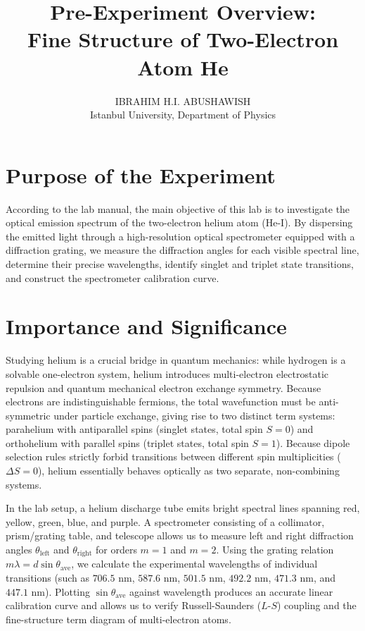 \documentclass[11pt,a4paper]{article}
\title{\textbf{Pre-Experiment Overview:\\ Fine Structure of Two-Electron Atom He}}
\author{IBRAHIM H.I. ABUSHAWISH \\ Istanbul University, Department of Physics}
\date{}
\begin{document}
\maketitle

\section*{Purpose of the Experiment}
According to the lab manual, the main objective of this lab is to investigate the optical emission spectrum of the two-electron helium atom (He-I). By dispersing the emitted light through a high-resolution optical spectrometer equipped with a diffraction grating, we measure the diffraction angles for each visible spectral line, determine their precise wavelengths, identify singlet and triplet state transitions, and construct the spectrometer calibration curve.

\section*{Importance and Significance}
Studying helium is a crucial bridge in quantum mechanics: while hydrogen is a solvable one-electron system, helium introduces multi-electron electrostatic repulsion and quantum mechanical electron exchange symmetry. Because electrons are indistinguishable fermions, the total wavefunction must be anti-symmetric under particle exchange, giving rise to two distinct term systems: parahelium with antiparallel spins (singlet states, total spin $S = 0$) and orthohelium with parallel spins (triplet states, total spin $S = 1$). Because dipole selection rules strictly forbid transitions between different spin multiplicities ($\Delta S = 0$), helium essentially behaves optically as two separate, non-combining systems.

In the lab setup, a helium discharge tube emits bright spectral lines spanning red, yellow, green, blue, and purple. A spectrometer consisting of a collimator, prism/grating table, and telescope allows us to measure left and right diffraction angles $\theta_{\text{left}}$ and $\theta_{\text{right}}$ for orders $m = 1$ and $m = 2$. Using the grating relation $m \lambda = d \sin\theta_{\text{ave}}$, we calculate the experimental wavelengths of individual transitions (such as $706.5\text{ nm}$, $587.6\text{ nm}$, $501.5\text{ nm}$, $492.2\text{ nm}$, $471.3\text{ nm}$, and $447.1\text{ nm}$). Plotting $\sin\theta_{\text{ave}}$ against wavelength produces an accurate linear calibration curve and allows us to verify Russell-Saunders ($L$-$S$) coupling and the fine-structure term diagram of multi-electron atoms.
\end{document}
